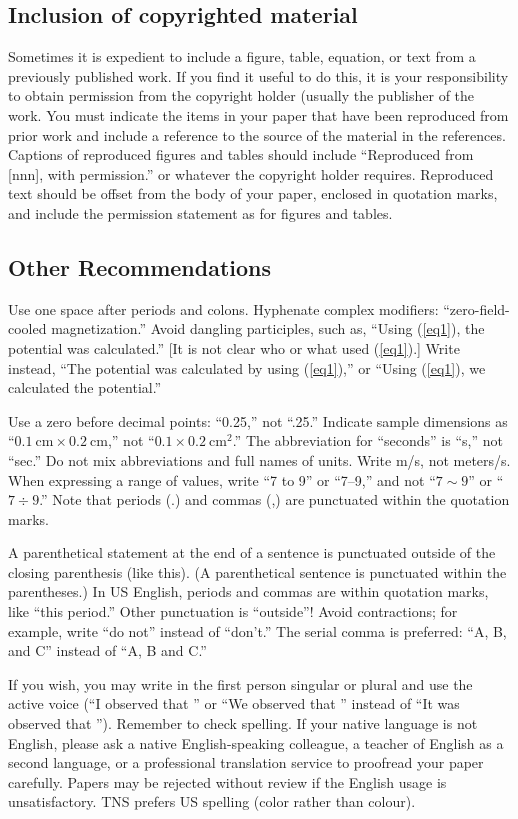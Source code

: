 \documentclass{IEEEtran}
\begin{document}
\subsection{Inclusion of copyrighted material}
Sometimes it is expedient to include a figure, table, equation, or text from
a previously published work. If you find it useful to do this, it is your
responsibility to obtain permission from the copyright holder (usually the
publisher of the work. You must indicate the items in your paper that have
been reproduced from prior work and include a reference to the source of the
material in the references. Captions of reproduced figures and tables should
include ``Reproduced from [nnn], with permission.'' or whatever the
copyright holder requires. Reproduced text should be offset from the body of
your paper, enclosed in quotation marks, and include the permission
statement as for figures and tables.

\subsection{Other Recommendations}
Use one space after periods and colons. Hyphenate complex modifiers:
``zero-field-cooled magnetization.'' Avoid dangling participles, such as,
``Using (\ref{eq1}), the potential was calculated.'' [It is not clear who or what
used (\ref{eq1}).] Write instead, ``The potential was calculated by using (\ref{eq1}),'' or
``Using (\ref{eq1}), we calculated the potential.''

Use a zero before decimal points: ``0.25,'' not ``.25.'' Indicate sample
dimensions as ``$0.1~\text{cm} \times 0.2~\text{cm}$,'' not ``$0.1
\times 0.2~\text{cm}^{2}$.'' The abbreviation for ``seconds'' is ``s,'' not ``sec.'' Do not
mix abbreviations and full names of units. Write m/s, not meters/s. When
expressing a range of values, write ``7 to 9'' or ``7--9,'' and not
``$7\sim9$'' or ``$7\div 9$.'' Note that periods (.) and commas
(,) are punctuated within the quotation marks.

A parenthetical statement at the end of a sentence is punctuated outside of
the closing parenthesis (like this). (A parenthetical sentence is punctuated
within the parentheses.) In US English, periods and commas are within
quotation marks, like ``this period.'' Other punctuation is ``outside''!
Avoid contractions; for example, write ``do not'' instead of ``don't.'' The
serial comma is preferred: ``A, B, and C'' instead of ``A, B and C.''

If you wish, you may write in the first person singular or plural and use
the active voice (``I observed that \textellipsis'' or ``We observed that \textellipsis''
instead of ``It was observed that \textellipsis''). Remember to check spelling. If
your native language is not English, please ask a native English-speaking
colleague, a teacher of English as a second language, or a professional
translation service to proofread your paper carefully. Papers may be
rejected without review if the English usage is unsatisfactory. TNS prefers
US spelling (color rather than colour).
\end{document}
